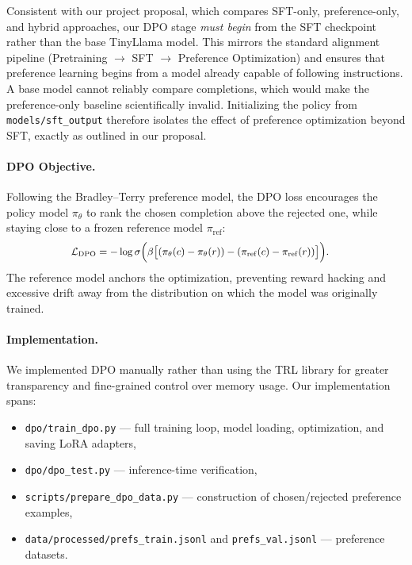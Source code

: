 \documentclass[11pt,a4paper]{article}
\begin{document}
Consistent with our project proposal, which compares SFT-only, preference-only, and hybrid approaches, our DPO stage \emph{must begin} from the SFT checkpoint rather than the base TinyLlama model. This mirrors the standard alignment pipeline (Pretraining $\rightarrow$ SFT $\rightarrow$ Preference Optimization) and ensures that preference learning begins from a model already capable of following instructions. A base model cannot reliably compare completions, which would make the preference-only baseline scientifically invalid. Initializing the policy from \texttt{models/sft\_output} therefore isolates the effect of preference optimization beyond SFT, exactly as outlined in our proposal.

\paragraph{DPO Objective.}
Following the Bradley--Terry preference model, the DPO loss encourages the 
policy model $\pi_{\theta}$ to rank the chosen completion above the rejected one,
while staying close to a frozen reference model $\pi_{\mathrm{ref}}$:
\begin{equation}
\small
\begin{aligned}
\mathcal{L}_{\text{DPO}} 
&= - \log \sigma\Big( 
\beta\big[
(\pi_{\theta}(c)-\pi_{\theta}(r)) 
- (\pi_{\mathrm{ref}}(c)-\pi_{\mathrm{ref}}(r))
\big]
\Big).
\end{aligned}
\end{equation}
The reference model anchors the optimization, preventing reward hacking and excessive drift away from the distribution on which the model was originally trained.

\paragraph{Implementation.}
We implemented DPO manually rather than using the TRL library for greater transparency and fine-grained control over memory usage. Our implementation spans:
\begin{itemize}
    \item \texttt{dpo/train\_dpo.py} --- full training loop, model loading, optimization, and saving LoRA adapters,
    \item \texttt{dpo/dpo\_test.py} --- inference-time verification,
    \item \texttt{scripts/prepare\_dpo\_data.py} --- construction of chosen/rejected preference examples,
    \item \texttt{data/processed/prefs\_train.jsonl} and \texttt{prefs\_val.jsonl} --- preference datasets.
\end{itemize}
\end{document}
